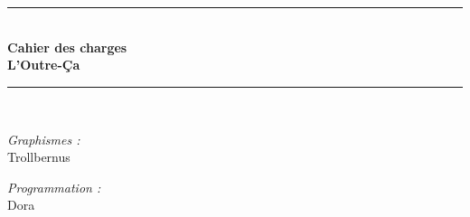\documentclass[french]{report}
\newcommand{\HRule}{\rule{\linewidth}{0.5mm}}
\theoremstyle{plain}
\begin{document}
\begin{titlepage}
\begin{center}
\begin{minipage}[t]{0.3\textwidth}
\begin{flushright}
	  \end{flushright}
	\end{minipage}
	\\[1cm]


	\textsc{\Large }\\[0.6cm]
	\HRule \\[0.8cm]
	{\huge \bfseries Cahier des charges \\ L'Outre-Ça}\\[0.4cm]
	\HRule \\[1cm]

	\begin{minipage}[t]{0.3\textwidth}
	  \begin{flushleft} \large
	    \emph{Graphismes :}\\
	    Trollbernus
	  \end{flushleft}
	\end{minipage}
	\begin{minipage}[t]{0.6\textwidth}
	  \begin{flushright} \large
	    \emph{Programmation :} \\
		Dora  


	  \end{flushright}

	\end{minipage}

















\end{center}
\end{titlepage}
\end{document}
